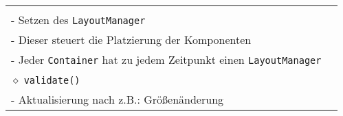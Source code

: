 \begin{longtable}{ | p{} p{} | }
{	\hspace{0.4cm} $\diamond$ \texttt{setLayout (LayoutManager manager)} \\
	\hspace{0.6cm} - Setzen des \texttt{LayoutManager} \\
	\hspace{0.6cm} - Dieser steuert die Platzierung der Komponenten \\ 
	\hspace{0.6cm} - Jeder \texttt{Container} hat zu jedem Zeitpunkt einen \texttt{LayoutManager} \\
	\hspace{0.4cm} $\diamond$ \texttt{validate()} \\
	\hspace{0.6cm} - Aktualisierung nach z.B.: Grö\ss enänderung } \\ \hline


\end{longtable}
